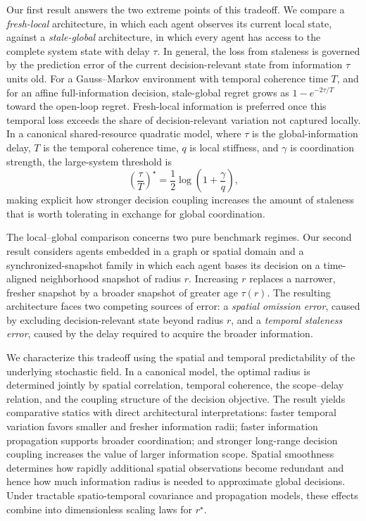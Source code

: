 \documentclass[11pt]{article}
\begin{document}
Our first result answers the two extreme points of this tradeoff. We compare a
\emph{fresh-local} architecture, in which each agent observes its current local
state, against a \emph{stale-global} architecture, in which every agent has
access to the complete system state with delay $\tau$. In general, the loss
from staleness is governed by the prediction error of the current
decision-relevant state from information $\tau$ units old. For a
Gauss--Markov environment with temporal coherence time $T$, and for an affine
full-information decision, stale-global regret grows as
$1-e^{-2\tau/T}$ toward the open-loop regret. Fresh-local information is
preferred once this temporal loss exceeds the share of decision-relevant
variation not captured locally. In a canonical shared-resource quadratic
model, where $\tau$ is the global-information delay, $T$ is the temporal
coherence time, $q$ is local stiffness, and $\gamma$ is coordination strength,
the large-system threshold is
\begin{equation}
    \left(\frac{\tau}{T}\right)^\star
    =
    \frac{1}{2}\log\left(1+\frac{\gamma}{q}\right),
    \label{eq:intro_coupling}
\end{equation}
making explicit how stronger decision coupling increases the amount of
staleness that is worth tolerating in exchange for global coordination.

The local--global comparison concerns two pure benchmark regimes. Our second
result considers agents embedded in a graph or spatial domain and a
synchronized-snapshot family in which each agent bases its decision on a
time-aligned neighborhood snapshot of radius $r$. Increasing $r$ replaces a
narrower, fresher snapshot by a broader snapshot of greater age $\tau(r)$.
The resulting architecture faces two
competing sources of error: a \emph{spatial omission error}, caused by
excluding decision-relevant state beyond radius $r$, and a
\emph{temporal staleness error}, caused by the delay required to acquire the
broader information.

We characterize this tradeoff using the spatial and temporal predictability of
the underlying stochastic field. In a canonical model, the optimal radius is
determined jointly by spatial correlation, temporal coherence, the
scope--delay relation, and the coupling structure of the decision objective.
The result yields comparative statics
with direct architectural interpretations: faster temporal variation favors
smaller and fresher information radii; faster information propagation supports
broader coordination; and stronger long-range decision coupling increases the
value of larger information scope. Spatial smoothness determines how rapidly
additional spatial observations become redundant and hence how much
information radius is needed to approximate global decisions. Under tractable
spatio-temporal covariance and propagation models, these effects combine into
dimensionless scaling laws for $r^\star$.
\end{document}
